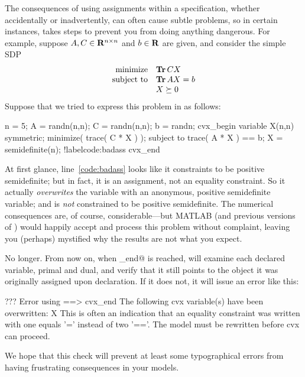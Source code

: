\documentclass[12pt]{article}
\begin{document}
The consequences of using assignments within a \cvx specification, whether
accidentally or inadvertently, can often cause subtle problems, so in certain
instances, \cvx takes steps to prevent you from doing anything dangerous.
For example, suppose $A,C\in\mathbf{R}^{{n}\times{n}}$ and $b\in\R$ are given, and
consider the simple SDP
\begin{equation}
	\begin{array}{rl}
		\text{minimize} & \operatorname{\textbf{Tr}}{CX} \\
		\text{subject to} & \operatorname{\textbf{Tr}}{AX} = b \\
		& X \succeq 0
	\end{array}
\end{equation}	
Suppose that we tried to express this problem in \cvx as follows:
\begin{code2}[firstnumber=1]
	n = 5;
	A = randn(n,n); C = randn(n,n); b = randn;
	cvx_begin
	    variable X(n,n) symmetric;
	    minimize( trace( C * X ) );
	    subject to
	        trace( A * X ) == b;
	        X = semidefinite(n);		!label{code:badass}
	cvx_end
\end{code2}
At first glance, line~\ref{code:badass} looks like it constraints \verb@X@ to be positive
semidefinite; but in fact, it is an assignment, not an equality constraint. So
it actually \emph{overwrites} the
variable \verb@X@ with an anonymous, positive semidefinite variable; and \verb@X@
is \emph{not} constrained to be positive semidefinite. The numerical
consequences are, of course, considerable---but MATLAB (and previous versions of \cvx)
would happily accept and process this problem without complaint, leaving you (perhaps)
mystified why the results are not what you expect.

No longer. From now on, when \verb@cvx_end@ is reached, \cvx will examine each 
declared variable, primal and dual, and verify that it still points to the object it was originally
assigned upon declaration. If it does not, 
it will issue an error like this:
\begin{code}
	??? Error using ==> cvx_end
	The following cvx variable(s) have been overwritten:
	   X
	This is often an indication that an equality constraint was
	written with one equals '=' instead of two '=='. The model
	must be rewritten before cvx can proceed.
\end{code}	
We hope that this check will prevent at least some typographical errors from 
having frustrating consequences in your models.
\end{document}
